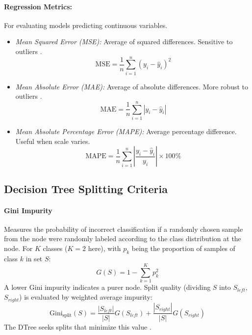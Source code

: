 \begin{appendices}
  \paragraph{Regression Metrics:}
  For evaluating models predicting continuous variables.
  \begin{itemize}
    \item \textit{Mean Squared Error (MSE):} Average of squared differences. Sensitive to outliers \autocite{fahrmeir2016statistik}.
          \begin{equation}
            \text{MSE} = \frac{1}{n} \sum_{i=1}^{n} (y_i - \hat{y}_i)^2 %
          \end{equation}
    \item \textit{Mean Absolute Error (MAE):} Average of absolute differences. More robust to outliers \autocite{fahrmeir2016statistik}.
          \begin{equation}
            \text{MAE} = \frac{1}{n} \sum_{i=1}^{n} |y_i - \hat{y}_i| %
          \end{equation}
    \item \textit{Mean Absolute Percentage Error (MAPE):} Average percentage difference. Useful when scale varies.
          \begin{equation}
            \text{MAPE} = \frac{1}{n} \sum_{i=1}^{n} \left| \frac{y_i - \hat{y}_i}{y_i} \right| \times 100\% %
          \end{equation}
  \end{itemize}


  \subsection{Decision Tree Splitting Criteria}
  \label{subsec:decision_tree_splitting_criteria} %

  \paragraph{Gini Impurity}
  Measures the probability of incorrect classification if a randomly chosen sample from the node were randomly labeled according to the class distribution at the node. For $K$ classes ($K = 2$ here), with $p_k$ being the proportion of samples of class $k$ in set $S$:
  \begin{equation}
    G(S) = 1 - \sum_{k=1}^{K} p_k^2
    \label{eq:gini_impurity} %
  \end{equation}
  A lower Gini impurity indicates a purer node. Split quality (dividing $S$ into $S_{left}$, $S_{right}$) is evaluated by weighted average impurity:
  \begin{equation}
    \text{Gini}_{\text{split}}(S) = \frac{|S_{left}|}{|S|} G(S_{left}) + \frac{|S_{right}|}{|S|} G(S_{right})
    \label{eq:gini_split} %
  \end{equation}
  The DTree seeks splits that minimize this value \autocite{breiman1984classification}.



\end{appendices}
